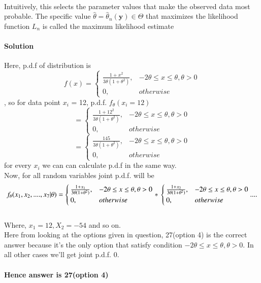 \documentclass[journal,12pt,twocolumn]{IEEEtran}
\begin{document}
\begin{enumerate}[label=\arabic*.,ref=\theenumi]
\paragraph{}
Intuitively, this selects the parameter values that make the observed data most probable. The specific value \({\hat {\theta }}={\hat {\theta }}_{n}(\mathbf {y} )\in \Theta \) that maximizes the likelihood function \( L_{n}\) is called the maximum likelihood estimate
\paragraph{Solution}
Here, p.d.f of distribution is \[
    f(x)= 
\begin{cases}
\frac{1 + x^2}{3\theta(1+\theta^2)},& -2\theta \leq x \leq \theta, \theta > 0\\
    0,              & otherwise
\end{cases}
\], so for data point \(x_i\) = 12, p.d.f. \(f_\theta(x_i = 12)\)  \[= \begin{cases}
\frac{1 + 12^2}{3\theta(1+\theta^2)},& -2\theta \leq x \leq \theta, \theta > 0\\
    0,              & otherwise
\end{cases}
\]
\[= \begin{cases}
\frac{145}{3\theta(1+\theta^2)},& -2\theta \leq x \leq \theta, \theta > 0\\
    0,              & otherwise
\end{cases}
\] 
for every \(x_i\) we can can calculate p.d.f in the same way. \\
Now, for all random variables joint p.d.f. will be 
\[f_\theta(x_1,x_2,....,x_7 | \theta)= \begin{cases}
\frac{1 + x_1}{3\theta(1+\theta^2)},& -2\theta \leq x \leq \theta, \theta > 0 \\
0,              & otherwise
\end{cases} * \\
 \begin{cases}
\frac{1 + x_2}{3\theta(1+\theta^2)},& -2\theta \leq x \leq \theta, \theta > 0\\
    0,              & otherwise
\end{cases} ....
\] 
\\ 
Where, \(x_1 = 12, X_2 = -54\) and so on.
\\ Here from looking at the options given in question, 27(option 4) is the correct answer because it's the only option that satisfy condition \(-2\theta \leq x \leq \theta , \theta > 0\). In all other cases we'll get joint p.d.f. 0.
\\\paragraph{}
\textbf{Hence answer is 27(option 4)}
\end{enumerate}
\end{document}
